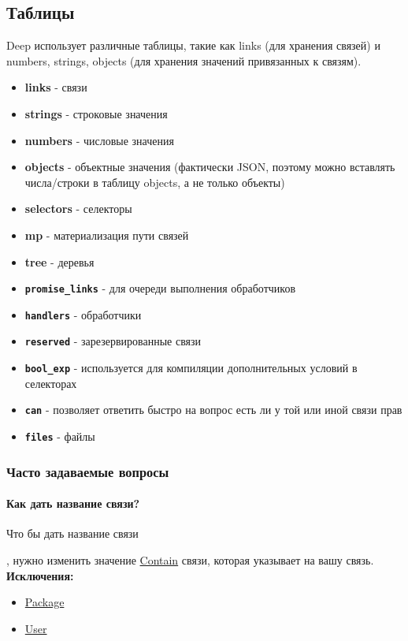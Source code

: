 \subsection{Таблицы}
Deep использует различные таблицы, такие как links (для хранения связей) и
numbers, strings, objects (для хранения значений привязанных к связям).

\begin{itemize}
      \item \textbf{links} - связи
      \item \textbf{strings} - строковые значения
      \item \textbf{numbers} - числовые значения
      \item \textbf{objects} - объектные значения (фактически JSON, поэтому
            можно
            вставлять числа/строки в таблицу objects, а не только объекты)
      \item \textbf{selectors} - селекторы
      \item \textbf{mp} - материализация пути связей
      \item \textbf{tree} - деревья
      \item \textbf{\texttt{promise\_links}} - для очереди выполнения
            обработчиков
      \item \textbf{\texttt{handlers}} - обработчики
      \item \textbf{\texttt{reserved}} - зарезервированные связи
      \item \textbf{\texttt{bool\_exp}} - используется для компиляции
            дополнительных условий в селекторах
      \item \textbf{\texttt{can}} - позволяет ответить быстро на вопрос есть ли
            у
            той или иной связи прав
      \item \textbf{\texttt{files}} - файлы
\end{itemize}

\subsubsection{Часто задаваемые вопросы}
\paragraph{Как дать название связи?}
\hypertarget{FAQ.HowToSetName}{Что бы дать название связи}, нужно изменить
значение \hyperlink{Core.Contain.Description}{Contain} связи, которая указывает
на вашу
связь. \\
\textbf{Исключения:}
\begin{itemize}
      \item \hyperlink{Core.Package.Description}{Package}
      \item \hyperlink{Core.Package.Description}{User}
\end{itemize}

